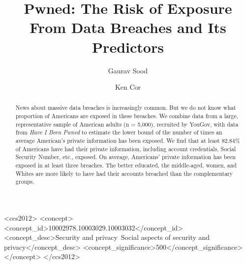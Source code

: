 \documentclass[sigconf]{acmart}
\begin{document}

%
\title[Pwned]{Pwned: The Risk of Exposure From Data Breaches and Its Predictors}

%
\author{Gaurav Sood}
\authornotemark[1]
\affiliation{%
  \institution{}
}

\author{Ken Cor}
\authornotemark[2]
\affiliation{%
  \institution{The University of Alberta}
  \city{Edmonton}
  \country{Canada}
}
%
\renewcommand{\shortauthors}{Sood and Cor}

%
\begin{abstract}
News about massive data breaches is increasingly common. But we do not know what proportion of Americans are exposed in these breaches. We combine data from a large, representative sample of American adults (n = 5,000), recruited by YouGov, with data from \textit{Have I Been Pwned} to estimate the lower bound of the number of times an average American's private information has been exposed. We find that at least 82.84\% of Americans have had their private information, including account credentials, Social Security Number, etc., exposed. On average, Americans' private information has been exposed in at least three breaches. The better educated, the middle-aged, women, and Whites are more likely to have had their accounts breached than the complementary groups.
\end{abstract}

%
%
\begin{CCSXML}
<ccs2012>
<concept>
<concept_id>10002978.10003029.10003032</concept_id>
<concept_desc>Security and privacy~Social aspects of security and privacy</concept_desc>
<concept_significance>500</concept_significance>
</concept>
</ccs2012>
\end{CCSXML}
\end{document}
